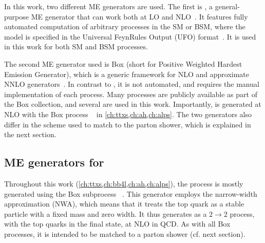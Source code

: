 In this work, two different ME generators are used. The first is \amcatnlo, a general-purpose ME generator that can work both at LO and NLO~\cite{MG5aMCatNLO:2014}. It features fully automated computation of arbitrary processes in the SM or BSM, where the model is specified in the Universal FeynRules Output (UFO) format~\cite{Degrande:2011ua}. It is used in this work for both SM and BSM processes. 

The second ME generator used is \powheg Box (short for Positive Weighted Hardest Emission Generator), which is a generic framework for NLO and approximate NNLO generators~\cite{Powheg:2004,Powheg:2007,Powheg:2010}. In contrast to \amcatnlo, it is not automated, and requires the manual implementation of each process. Many processes are publicly available as part of the \powheg Box collection, and several are used in this work. Importantly, \pptt is generated at NLO with the \powheg Box process \hvq~\cite{Frixione:2007nw} in \cref{ch:ttxs,ch:ah,ch:alps}. %
The two generators also differ in the scheme used to match to the parton shower, which is explained in the next section.

\subsection{ME generators for \ttbartitle}
\label{sec:mc:ttbar}

Throughout this work (\cref{ch:ttxs,ch:bb4l,ch:ah,ch:alps}), the \pptt process is mostly generated using the \powheg Box subprocess \hvq~\cite{Frixione:2007nw}. This generator employs the narrow-width approximation (NWA), which means that it treats the top quark as a stable particle with a fixed mass and zero width. It thus generates \pptt as a $2 \rightarrow 2$ process, with the top quarks in the final state, at NLO in QCD. As with all \powheg Box processes, it is intended to be matched to a parton shower (cf. next section). 

